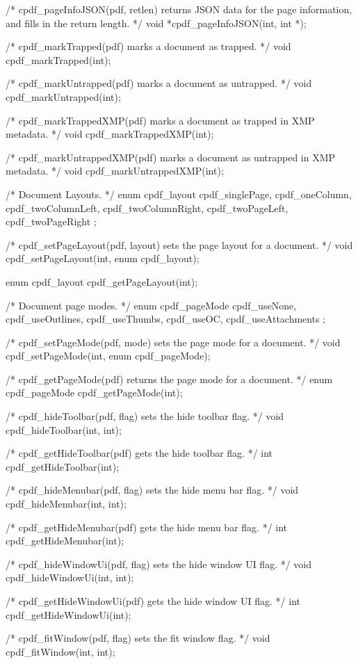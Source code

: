 /* cpdf_pageInfoJSON(pdf, retlen) returns JSON data for the page
information, and fills in the return length. */
void *cpdf_pageInfoJSON(int, int *);

/* cpdf_markTrapped(pdf) marks a document as trapped. */
void cpdf_markTrapped(int);

/* cpdf_markUntrapped(pdf) marks a document as untrapped. */
void cpdf_markUntrapped(int);

/* cpdf_markTrappedXMP(pdf) marks a document as trapped in XMP metadata. */
void cpdf_markTrappedXMP(int);

/* cpdf_markUntrappedXMP(pdf) marks a document as untrapped in XMP metadata. */
void cpdf_markUntrappedXMP(int);

/* Document Layouts. */
enum cpdf_layout {
  cpdf_singlePage,
  cpdf_oneColumn,
  cpdf_twoColumnLeft,
  cpdf_twoColumnRight,
  cpdf_twoPageLeft,
  cpdf_twoPageRight
};

/* cpdf_setPageLayout(pdf, layout) sets the page layout for a document. */
void cpdf_setPageLayout(int, enum cpdf_layout);

enum cpdf_layout cpdf_getPageLayout(int);

/* Document page modes. */
enum cpdf_pageMode {
  cpdf_useNone,
  cpdf_useOutlines,
  cpdf_useThumbs,
  cpdf_useOC,
  cpdf_useAttachments
};

/* cpdf_setPageMode(pdf, mode) sets the page mode for a document. */
void cpdf_setPageMode(int, enum cpdf_pageMode);

/* cpdf_getPageMode(pdf) returns the page mode for a document. */
enum cpdf_pageMode cpdf_getPageMode(int);

/* cpdf_hideToolbar(pdf, flag) sets the hide toolbar flag. */
void cpdf_hideToolbar(int, int);

/* cpdf_getHideToolbar(pdf) gets the hide toolbar flag. */
int cpdf_getHideToolbar(int);

/* cpdf_hideMenubar(pdf, flag) sets the hide menu bar flag. */
void cpdf_hideMenubar(int, int);

/* cpdf_getHideMenubar(pdf) gets the hide menu bar flag. */
int cpdf_getHideMenubar(int);

/* cpdf_hideWindowUi(pdf, flag) sets the hide window UI flag. */
void cpdf_hideWindowUi(int, int);

/* cpdf_getHideWindowUi(pdf) gets the hide window UI flag. */
int cpdf_getHideWindowUi(int);

/* cpdf_fitWindow(pdf, flag) sets the fit window flag. */
void cpdf_fitWindow(int, int);

